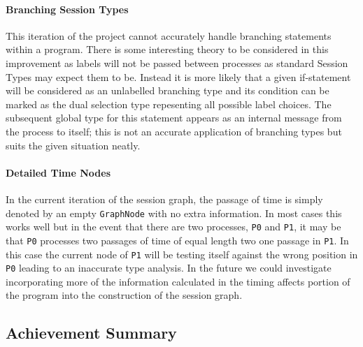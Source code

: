 \documentclass[11pt]{scrartcl}
\begin{document}
\paragraph{Branching Session Types}
This iteration of the project cannot accurately handle branching statements 
within a program. There is some interesting theory to be considered in this
improvement as labels will not be passed between processes as standard Session
Types may expect them to be. Instead it is more likely that a given if-statement
will be considered as an unlabelled branching type and its condition
can be marked as the dual selection type repesenting all possible label choices.
The subsequent global type for this statement appears as an internal message
from the process to itself; this is not an accurate application of branching
types but suits the given situation neatly.

\paragraph{Detailed Time Nodes}
In the current iteration of the session graph, the passage of time is simply
denoted by an empty \texttt{GraphNode} with no extra information. In most cases
this works well but in the event that there are two processes, \texttt{P0} and
\texttt{P1}, it may be that \texttt{P0} processes two passages of time of equal
length two one passage in \texttt{P1}. In this case the current node of 
\texttt{P1} will be testing itself against the wrong position in \texttt{P0} 
leading to an inaccurate type analysis. In the future we could investigate
incorporating more of the information calculated in the timing affects portion
of the program into the construction of the session graph.

\subsection{Achievement Summary}
\newpage
\end{document}
